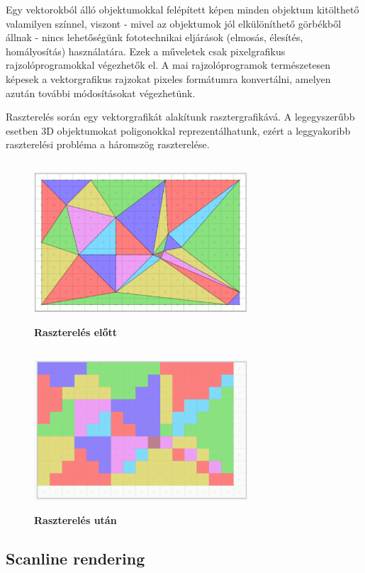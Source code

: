 \documentclass[12pt]{article}
\theoremstyle{plain}
\begin{document}
Egy vektorokból álló objektumokkal felépített képen minden objektum kitölthető valamilyen színnel, viszont - mivel az objektumok jól elkülöníthető görbékből állnak - nincs lehetőségünk fototechnikai eljárások (elmosás, élesítés, homályosítás) használatára. Ezek a műveletek csak pixelgrafikus rajzolóprogramokkal végezhetők el. A mai rajzolóprogramok természetesen képesek a vektorgrafikus rajzokat pixeles formátumra konvertálni, amelyen azután további módosításokat végezhetünk. 

Raszterelés során egy vektorgrafikát alakítunk rasztergrafikává. A legegyszerűbb esetben 3D objektumokat poligonokkal reprezentálhatunk, ezért a leggyakoribb raszterelési probléma a háromszög raszterelése. 



\begin{figure}[H]
   \centering
   \includegraphics[width=8cm, height=6cm]{media/rasterelott.PNG}
   \caption{\textbf{Raszterelés előtt}}
   \label{fig:GeneralDiagram}
\end{figure}

\begin{figure}[H]
   \centering
   \includegraphics[width=8cm, height=6cm]{media/rasterutan.PNG}
   \caption{\textbf{Raszterelés után}}
   \label{fig:GeneralDiagram}
\end{figure}


\subsection{Scanline rendering}
\end{document}

